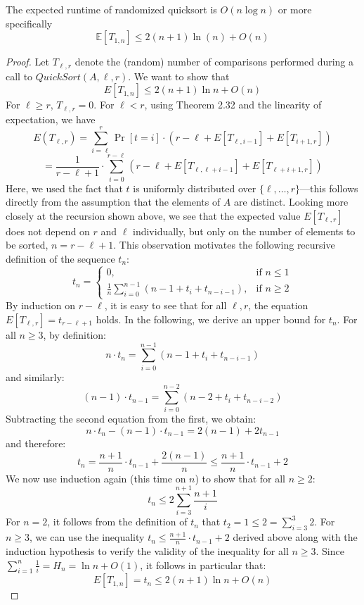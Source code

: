 \begin{theorem}
	The expected runtime of randomized quicksort is $O(n \log n)$ or more specifically
	$$\mathbb{E}[T_{1,n}] \leq 2(n+1)\ln(n) + O(n)$$
\end{theorem}

\begin{proof}
	Let $T_{\ell,r}$ denote the (random) number of comparisons performed during a call to $QuickSort(A, \ell, r)$. We want to show that
	$$E[T_{1,n}] \le 2(n + 1) \ln n + O(n)$$
	For $\ell \ge r$, $T_{\ell,r} = 0$. For $\ell < r$, using Theorem 2.32 and the linearity of expectation, we have
	$$E(T_{\ell,r}) = \sum_{i=\ell}^{r} \Pr[t = i] \cdot (r - \ell + E[T_{\ell,i-1}] + E[T_{i+1,r}])$$
	$$= \frac{1}{r - \ell + 1} \cdot \sum_{i=0}^{r-\ell} (r - \ell + E[T_{\ell,\ell+i-1}] + E[T_{\ell+i+1,r}])$$
	Here, we used the fact that $t$ is uniformly distributed over $\{\ell, \dots, r\}$—this follows directly from the assumption that the elements of $A$ are distinct.
	Looking more closely at the recursion shown above, we see that the expected value $E[T_{\ell,r}]$ does not depend on $r$ and $\ell$ individually, but only on the number of elements to be sorted, $n = r - \ell + 1$. This observation motivates the following recursive definition of the sequence $t_n$:
	$$t_n = \begin{cases} 0, & \text{if } n \le 1 \\ \frac{1}{n} \sum_{i=0}^{n-1} (n - 1 + t_i + t_{n-i-1}), & \text{if } n \ge 2 \end{cases}$$
	By induction on $r - \ell$, it is easy to see that for all $\ell, r$, the equation $E[T_{\ell,r}] = t_{r-\ell+1}$ holds. In the following, we derive an upper bound for $t_n$. For all $n \ge 3$, by definition:
	$$n \cdot t_n = \sum_{i=0}^{n-1} (n - 1 + t_i + t_{n-i-1})$$
	and similarly:
	$$(n - 1) \cdot t_{n-1} = \sum_{i=0}^{n-2} (n - 2 + t_i + t_{n-i-2})$$
	Subtracting the second equation from the first, we obtain:
	$$n \cdot t_n - (n - 1) \cdot t_{n-1} = 2(n - 1) + 2t_{n-1}$$
	and therefore:
	$$t_n = \frac{n + 1}{n} \cdot t_{n-1} + \frac{2(n - 1)}{n} \le \frac{n + 1}{n} \cdot t_{n-1} + 2$$
	We now use induction again (this time on $n$) to show that for all $n \ge 2$:
	$$t_n \le 2 \sum_{i=3}^{n+1} \frac{n+1}{i}$$
	For $n = 2$, it follows from the definition of $t_n$ that $t_2 = 1 \le 2 = \sum_{i=3}^{3} 2$. For $n \ge 3$, we can use the inequality $t_n \le \frac{n+1}{n} \cdot t_{n-1} + 2$ derived above along with the induction hypothesis to verify the validity of the inequality for all $n \ge 3$.
	Since $\sum_{i=1}^{n} \frac{1}{i} = H_n = \ln n + O(1)$, it follows in particular that:
	$$E[T_{1,n}] = t_n \le 2(n + 1) \ln n + O(n)$$
\end{proof}


